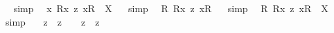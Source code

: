 \begin{isabellebody}
\isadelimproof
\ %
\endisadelimproof
%
\isatagproof
{}\isamarkupfalse%
\ {\isacharparenleft}simp{\isacharparenright}\ \isamarkupfalse%
%
\endisatagproof
{\isafoldproof}%
%
\isadelimproof
%
\endisadelimproof
\isanewline
{}\isamarkupfalse%
\ {\isachardoublequoteopen}{\isasymforall}{\isacharparenleft}{\isasymlambda}x{\isachardot}\ {\isacharless}R{}{\isasymbullet}{\isachardot}x{\isachardot}{\isachargreater}\ {\isasymrightarrow}\isactrlsup z\ {\isacharless}{\isachardot}x{\isachardot}{\isasymcirc}R{}{\isachargreater}{\isacharparenright}\ {\isacharequal}\ X{\isachardoublequoteclose}%
\isadelimproof
\ %
\endisadelimproof
%
\isatagproof
{}\isamarkupfalse%
\ {\isacharparenleft}simp{\isacharparenright}\ \isamarkupfalse%
%
\endisatagproof
{\isafoldproof}%
%
\isadelimproof
%
\endisadelimproof
\isanewline
{}\isamarkupfalse%
\ {\isachardoublequoteopen}{\isacharbrackleft}{\isasymforall}{\isacharparenleft}{\isasymlambda}R{\isachardot}\ {\isacharless}{\isachardot}R{\isachardot}{\isasymbullet}{\isachardot}x{\isachardot}{\isachargreater}\ {\isasymrightarrow}\isactrlsup z\ {\isacharless}{\isachardot}x{\isachardot}{\isasymcirc}{\isachardot}R{\isachardot}{\isachargreater}{\isacharparenright}{\isacharbrackright}{\isachardoublequoteclose}%
\isadelimproof
\ %
\endisadelimproof
%
\isatagproof
{}\isamarkupfalse%
\ {\isacharparenleft}simp{\isacharparenright}\ \isamarkupfalse%
%
\endisatagproof
{\isafoldproof}%
%
\isadelimproof
%
\endisadelimproof
\isanewline
{}\isamarkupfalse%
\ {\isachardoublequoteopen}{\isasymforall}{\isacharparenleft}{\isasymlambda}R{\isachardot}\ {\isacharless}{\isachardot}R{\isachardot}{\isasymbullet}{\isachardot}x{\isachardot}{\isachargreater}\ {\isasymrightarrow}\isactrlsup z\ {\isacharless}{\isachardot}x{\isachardot}{\isasymcirc}{\isachardot}R{\isachardot}{\isachargreater}{\isacharparenright}\ {\isacharequal}\ X{\isachardoublequoteclose}%
\isadelimproof
\ %
\endisadelimproof
%
\isatagproof
{}\isamarkupfalse%
\ {\isacharparenleft}simp{\isacharparenright}\ \isamarkupfalse%
%
\endisatagproof
{\isafoldproof}%
%
\isadelimproof
%
\endisadelimproof
%
\isamarkuptrue%
\isamarkupfalse%
\ {\isachardoublequoteopen}{\isacharcomma}{\isasymphi}{\isacharcomma}\ {\isasymand}\isactrlsup z\ {\isacharcomma}{\isasympsi}{\isacharcomma}\ {\isasymrightarrow}\isactrlsup z\ {\isacharcomma}{\isasymchi}{\isacharcomma}\ {\isasymequiv}\ {\isacharparenleft}{\isacharcomma}{\isasymphi}{\isacharcomma}\ {\isasymand}\isactrlsup z\ {\isacharcomma}{\isasympsi}{\isacharcomma}{\isacharparenright}\ {\isasymrightarrow}\isactrlsup z\ {\isacharcomma}{\isasymchi}{\isacharcomma}{\isachardoublequoteclose}%

\end{isabellebody}
